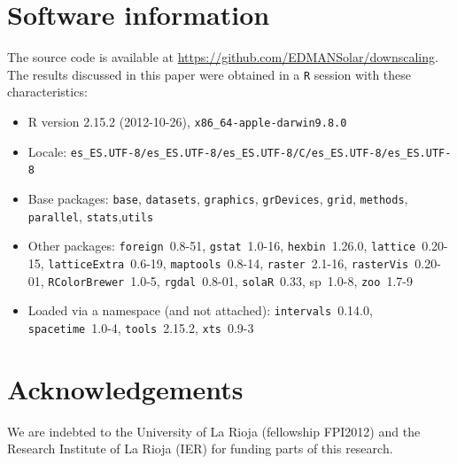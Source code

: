 \documentclass[11pt, english]{article}
\begin{document}
\section*{Software information}
\label{sec:session}

The source code is available at
\url{https://github.com/EDMANSolar/downscaling}. The results discussed
in this paper were obtained in a \texttt{R} session with these
characteristics:

\begin{itemize}\raggedright
\item R version 2.15.2 (2012-10-26), \verb|x86_64-apple-darwin9.8.0|
  \item Locale:
    \verb|es_ES.UTF-8/es_ES.UTF-8/es_ES.UTF-8/C/es_ES.UTF-8/es_ES.UTF-8|
  \item Base packages: \texttt{base}, \texttt{datasets},
    \texttt{graphics}, \texttt{grDevices}, \texttt{grid},
    \texttt{methods}, \texttt{parallel}, \texttt{stats},\texttt{utils}
  \item Other packages: \texttt{foreign}~0.8-51,
    \texttt{gstat}~1.0-16, \texttt{hexbin}~1.26.0,
    \texttt{lattice}~0.20-15, \texttt{latticeExtra}~0.6-19,
    \texttt{maptools}~0.8-14, \texttt{raster}~2.1-16,
    \texttt{rasterVis}~0.20-01, \texttt{RColorBrewer}~1.0-5,
    \texttt{rgdal}~0.8-01, \texttt{solaR}~0.33, sp~1.0-8,
    \texttt{zoo}~1.7-9
  \item Loaded via a namespace (and not attached):
    \texttt{intervals}~0.14.0, \texttt{spacetime}~1.0-4,
    \texttt{tools}~2.15.2, \texttt{xts}~0.9-3
\end{itemize}


\section*{Acknowledgements}
We are indebted to the University of La Rioja (fellowship FPI2012) and
the Research Institute of La Rioja (IER) for funding parts of this
research.
\end{document}
